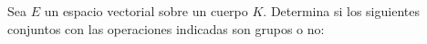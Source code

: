 \question
Sea $E$ un espacio vectorial sobre un cuerpo $K$. Determina si los siguientes 
conjuntos con las operaciones indicadas son grupos o no:
